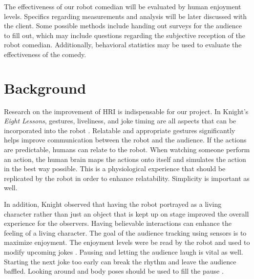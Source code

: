 \documentclass[onecolumn, draftclsnofoot,10pt, compsoc]{IEEEtran}
\begin{document}
The effectiveness of our robot comedian will be evaluated by human enjoyment levels. Specifics regarding measurements and analysis will be later discussed with the client. Some possible methods include handing out surveys for the audience to fill out, which may include questions regarding the subjective reception of the robot comedian. Additionally, behavioral statistics may be used to evaluate the effectiveness of the comedy.

\section{Background}

Research on the improvement of HRI is indispensable for our project. In Knight's \textit{Eight Lessons}, gestures, liveliness, and joke timing are all aspects that can be incorporated into the robot {\cite{KnightEightLessons:2011}}.
Relatable and appropriate gestures significantly helps improve communication between the robot and the audience. If the actions are predictable, humans can relate to the robot.
When watching someone perform an action, the human brain maps the actions onto itself and simulates the action in the best way possible. This is a physiological experience that should be replicated by the robot in order to enhance relatability. Simplicity is important as well. {\cite{KnightEightLessons:2011}}


In addition, Knight observed that having the robot portrayed as a living character rather than just an object that is kept up on stage improved the overall experience for the observers. Having believable interactions can enhance the feeling of a living character.
The goal of the audience tracking using sensors is to maximize enjoyment. The enjoyment levels were be read by the robot and used to modify upcoming jokes {\cite{KnightEightLessons:2011}}. Pausing and letting the audience laugh is vital as well. Starting the next joke too early can break the rhythm and leave the audience baffled. Looking around and body poses should be used to fill the pause {\cite{KnightEightLessons:2011}}.
\end{document}
